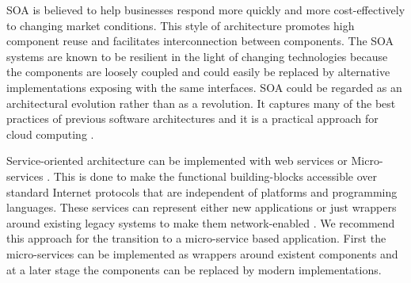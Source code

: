 	SOA is believed to help businesses respond more quickly and more cost-effectively to changing market conditions. This style of architecture promotes high component reuse and facilitates interconnection between components. The SOA systems are known to be resilient in the light of changing technologies because the components are loosely coupled and could easily be replaced by alternative implementations exposing with the same interfaces.	SOA could be regarded as an architectural evolution rather than as a revolution. It captures many of the best practices of previous software architectures and it is a practical approach for cloud computing \citep{velte2019cloud}.
	
	Service-oriented architecture can be implemented with web services or Micro-services \citep{brandner2004web}. This is done to make the functional building-blocks accessible over standard Internet protocols that are independent of platforms and programming languages. These services can represent either new applications or just wrappers around existing legacy systems to make them network-enabled \citep{channabasavaiah2003migrating}. We recommend this approach for the transition to a micro-service based application. First the micro-services can be implemented as wrappers around existent components and at a later stage the components can be replaced by modern implementations. 